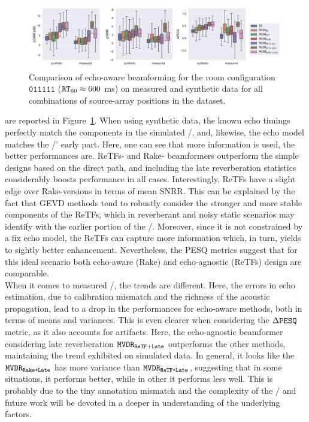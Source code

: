 \begin{figure}[t]
    \begin{fullwidth}
        \centering
        \includegraphics[trim={0 10 10 0},clip,width=\linewidth]{figures/dechorateapp/kowalkzy_results_boxplot.pdf}
        \caption{
        Comparison of echo-aware beamforming for the room configuration $\mathtt{011111}$ ($\mathtt{RT}_{60} \approx 600 $ ms) on measured and synthetic data  for all combinations of source-array positions in the \dEchorate{} dataset.}
        \label{fig:dechorateapp:se:results}
    \end{fullwidth}
\end{figure}

 are reported in Figure~\ref{fig:dechorateapp:se:results}.
When using synthetic data, the known echo timings perfectly match the components in the simulated \RIRs/, and, likewise, the echo model matches the \RIRs/' early part.
Here, one can see that more information is used, the better performances are. \acp{ReTF}- and Rake- beamformers outperform the simple designs based on the direct path, and including the late reverberation statistics considerably boosts performance in all cases.
Interestingly, \acp{ReTF} have a slight edge over Rake-versions in terms of mean \ac{SNRR}.
This can be explained by the fact that \ac{GEVD} methods tend to robustly consider the stronger and more stable components of the \acp{ReTF}, which in reverberant and noisy static scenarios may identify with the earlier portion of the \RIRs/.
Moreover, since it is not constrained by a fix echo model, the \acp{ReTF} can capture more information which, in turn, yields to sightly better enhancement.
Nevertheless, the \ac{PESQ} metrics suggest that for this ideal scenario  both echo-aware (Rake) and echo-agnostic (\acp{ReTF}) design are comparable.
\\When it comes to measured \RIRs/, the trends are different.
Here, the errors in echo estimation, due to calibration mismatch and the richness of the acoustic propagation, lead to a drop in the performances for echo-aware methods, both in terms of means and variances.
This is even clearer when considering the $\Delta\mathtt{PESQ}$ metric, as it also accounts for artifacts.
Here, the echo-agnostic beamformer considering late reverberation $\mathtt{MVDR}_\mathtt{ReTF+Late}$ outperforms the other methods, maintaining the trend exhibited on simulated data.
In general, it looks like the $\mathtt{MVDR}_\texttt{Rake+Late}$ has more variance than $\mathtt{MVDR}_\texttt{ReTF+Late}$, suggesting that in some situations, it performs better, while in other it performs less well.
This is probably due to the tiny annotation mismatch and the complexity of the \RIRs/ and future work will be devoted in a deeper in understanding of the underlying factors.

